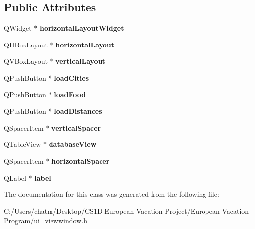 \subsection*{Public Attributes}
\begin{DoxyCompactItemize}
\item 
\mbox{\label{class_ui___view_window_a92833a09c1b30d803c96a88bbdaa3518}} 
Q\+Widget $\ast$ {\bfseries horizontal\+Layout\+Widget}
\item 
\mbox{\label{class_ui___view_window_a038aac36d3ef357a6f83e5d4c374d694}} 
Q\+H\+Box\+Layout $\ast$ {\bfseries horizontal\+Layout}
\item 
\mbox{\label{class_ui___view_window_aa88f882b5eeb08a567a471cbdcd139d5}} 
Q\+V\+Box\+Layout $\ast$ {\bfseries vertical\+Layout}
\item 
\mbox{\label{class_ui___view_window_aa1b1460286de8ab1fb41f1e0214f3d9c}} 
Q\+Push\+Button $\ast$ {\bfseries load\+Cities}
\item 
\mbox{\label{class_ui___view_window_a91d5781062444461d115e1ecdb29711c}} 
Q\+Push\+Button $\ast$ {\bfseries load\+Food}
\item 
\mbox{\label{class_ui___view_window_a0a3ce10a8f42310ac3ce36232f731fa7}} 
Q\+Push\+Button $\ast$ {\bfseries load\+Distances}
\item 
\mbox{\label{class_ui___view_window_a1710a9694395cd91e402f23341d3d94c}} 
Q\+Spacer\+Item $\ast$ {\bfseries vertical\+Spacer}
\item 
\mbox{\label{class_ui___view_window_ad372b75b3dfd029b0d589c548a2fe15e}} 
Q\+Table\+View $\ast$ {\bfseries database\+View}
\item 
\mbox{\label{class_ui___view_window_ade3d989153c6811c337912ea80b049bc}} 
Q\+Spacer\+Item $\ast$ {\bfseries horizontal\+Spacer}
\item 
\mbox{\label{class_ui___view_window_ae9f72959df12fe7be07ca24ff3e56291}} 
Q\+Label $\ast$ {\bfseries label}
\end{DoxyCompactItemize}


The documentation for this class was generated from the following file\+:\begin{DoxyCompactItemize}
\item 
C\+:/\+Users/chatm/\+Desktop/\+C\+S1\+D-\/\+European-\/\+Vacation-\/\+Project/\+European-\/\+Vacation-\/\+Program/ui\+\_\+viewwindow.\+h\end{DoxyCompactItemize}
